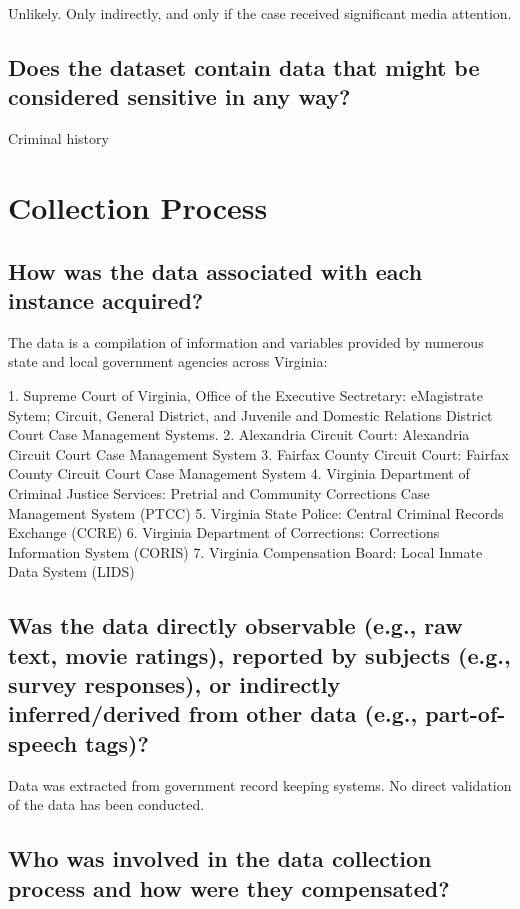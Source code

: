 \documentclass[letterpaper, 10 pt, conference]{ieeeconf}  %
\begin{document}
Unlikely. Only indirectly, and only if the case received significant media attention.  

\subsection{Does the dataset contain data that might be considered sensitive in any way?}

Criminal history


\section{Collection Process}

\subsection{How was the data associated with each instance acquired?}

The data is a compilation of information and
variables provided by numerous state and local government agencies across Virginia:

1. Supreme Court of Virginia, Office of the Executive Sectretary: eMagistrate Sytem; Circuit, General District, and Juvenile and Domestic Relations District Court Case Management
Systems.
2. Alexandria Circuit Court: Alexandria Circuit Court Case Management System
3. Fairfax County Circuit Court: Fairfax County Circuit Court Case Management System
4. Virginia Department of Criminal Justice Services: Pretrial and Community Corrections Case Management System (PTCC)
5. Virginia State Police: Central Criminal Records Exchange (CCRE)
6. Virginia Department of Corrections: Corrections Information System (CORIS)
7. Virginia Compensation Board: Local Inmate Data System (LIDS)

\subsection{Was the data directly observable (e.g., raw text, movie ratings), reported by subjects (e.g., survey responses), or indirectly inferred/derived from other data (e.g., part-of-speech tags)?}

Data was extracted from government record keeping systems. No direct validation of the data has been conducted. 

\subsection{Who was involved in the data collection process and how were they compensated?}
\end{document}
